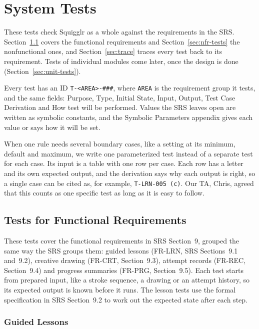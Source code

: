 \documentclass[12pt, titlepage]{article}
\begin{document}
\section{System Tests}
\label{sec:system-tests}

These tests check Squigglr as a whole against the requirements in the SRS.
Section~\ref{sec:fr-tests} covers the functional requirements and
Section~\ref{sec:nfr-tests} the nonfunctional ones, and
Section~\ref{sec:trace} traces every test back to its requirement. Tests of
individual modules come later, once the design is done
(Section~\ref{sec:unit-tests}).

Every test has an ID \texttt{T-<AREA>-\#\#\#}, where \texttt{AREA} is the
requirement group it tests, and the same fields: Purpose, Type, Initial State,
Input, Output, Test Case Derivation and How test will be performed. Values the SRS leaves open are
written as symbolic constants, and the Symbolic Parameters appendix gives each
value or says how it will be set.

When one rule needs several boundary cases, like a setting at its minimum,
default and maximum, we write one parameterized test instead of a separate
test for each case. Its input is a table with one row per case. Each row has a
letter and its own expected output, and the derivation says why each output is
right, so a single case can be cited as, for example, \texttt{T-LRN-005 (c)}.
Our TA, Chris, agreed that this counts as one specific test as long as it is
easy to follow.

\subsection{Tests for Functional Requirements}
\label{sec:fr-tests}

These tests cover the functional requirements in SRS Section~9, grouped the
same way the SRS groups them: guided lessons (FR-LRN, SRS Sections~9.1
and~9.2), creative drawing (FR-CRT, Section~9.3), attempt records (FR-REC,
Section~9.4) and progress summaries (FR-PRG, Section~9.5). Each test starts
from prepared input, like a stroke sequence, a drawing or an attempt history,
so its expected output is known before it runs. The lesson tests use the
formal specification in SRS Section~9.2 to work out the expected state after
each step.

\subsubsection{Guided Lessons}
\label{sec:lrn-tests}
\end{document}
